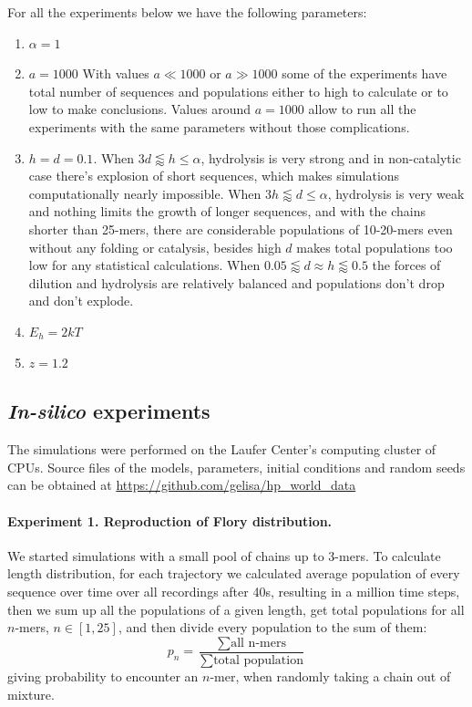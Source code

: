 \documentclass[5p,times]{elsarticle}
\newcommand*{\ga}{\alpha}
\begin{document}
For all the experiments below we have the following parameters:
\begin{enumerate}
 \item $\ga = 1$
 \item $a=1000$
 \subitem With values $a\ll 1000\,\,\mbox{or}\,\,a\gg1000$ some of the experiments have total 
number of sequences and populations either to high to calculate or to low to make conclusions. 
Values around $a=1000$ allow to run all the experiments with the same parameters without those 
complications.
 \item $h=d=0.1$.
 \subitem When $3d\lessapprox h\leq\ga$, hydrolysis is very strong and in 
non-catalytic case there's explosion of short sequences, which makes simulations computationally 
nearly impossible. 
\subitem When $3h\lessapprox d\leq\ga$, hydrolysis is very weak and nothing limits the 
growth of longer sequences, and with the chains shorter than 25-mers, there are considerable 
populations of 10-20-mers even without any folding or catalysis, besides high $d$ makes total 
populations too low for any statistical calculations. 
\subitem When $0.05\lessapprox d\approx h \lessapprox 0.5$ the forces of dilution and hydrolysis 
are relatively balanced and populations don't drop and don't explode.
 \item $E_h = 2kT$
 \item $z=1.2$
\end{enumerate}


\subsection{\textit{In-silico} experiments}\label{sec:experiments}
The simulations were performed on the Laufer Center's computing cluster of CPUs. 
Source files of the models, parameters, initial conditions and random seeds can be obtained at 
\url{https://github.com/gelisa/hp_world_data}


\paragraph{Experiment 1. Reproduction of Flory distribution.}\label{sec:expt1}
We started simulations with a small pool of chains up to 3-mers. To calculate length distribution, 
for each trajectory we calculated average population of every sequence over time over all 
recordings 
after 40s, resulting in a million time steps, then we sum up all the populations of a given 
length, 
get total populations for all $n$-mers, $n\in[1,25]$, and then divide every population to the sum 
of them:
\begin{equation}
 p_n = \frac{\sum\mbox{all n-mers}}{\sum\mbox{total population}}
\end{equation}
giving probability to encounter an $n$-mer, when randomly taking a chain out of mixture.
\end{document}
